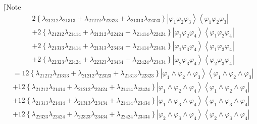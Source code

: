 \documentclass[aps,preprint]{revtex4}%
\begin{document}
$\lceil$Note
\begin{align}
&  2\left\{  \lambda_{21212}\lambda_{21313}+\lambda_{21212}\lambda
_{22323}+\lambda_{21313}\lambda_{22323}\right\}  \left\vert \varphi_{1}%
\varphi_{2}\varphi_{3}\right\rangle \left\langle \varphi_{1}\varphi_{2}%
\varphi_{3}\right\vert \nonumber\\
&  +2\left\{  \lambda_{21212}\lambda_{21414}+\lambda_{21212}\lambda
_{22424}+\lambda_{21414}\lambda_{22424}\right\}  \left\vert \varphi_{1}%
\varphi_{2}\varphi_{4}\right\rangle \left\langle \varphi_{1}\varphi_{2}%
\varphi_{4}\right\vert \nonumber\\
&  +2\left\{  \lambda_{21313}\lambda_{21414}+\lambda_{21313}\lambda
_{23434}+\lambda_{21414}\lambda_{23434}\right\}  \left\vert \varphi_{1}%
\varphi_{3}\varphi_{4}\right\rangle \left\langle \varphi_{1}\varphi_{3}%
\varphi_{4}\right\vert \nonumber\\
&  +2\left\{  \lambda_{22323}\lambda_{22424}+\lambda_{22323}\lambda
_{23434}+\lambda_{22424}\lambda_{23434}\right\}  \left\vert \varphi_{2}%
\varphi_{3}\varphi_{4}\right\rangle \left\langle \varphi_{2}\varphi_{3}%
\varphi_{4}\right\vert \nonumber
\end{align}%
\begin{align}
&  =12\left\{  \lambda_{21212}\lambda_{21313}+\lambda_{21212}\lambda
_{22323}+\lambda_{21313}\lambda_{22323}\right\}  \left\vert \varphi_{1}%
\wedge\varphi_{2}\wedge\varphi_{3}\right\rangle \left\langle \varphi_{1}%
\wedge\varphi_{2}\wedge\varphi_{3}\right\vert \nonumber\\
&  +12\left\{  \lambda_{21212}\lambda_{21414}+\lambda_{21212}\lambda
_{22424}+\lambda_{21414}\lambda_{22424}\right\}  \left\vert \varphi_{1}%
\wedge\varphi_{2}\wedge\varphi_{4}\right\rangle \left\langle \varphi_{1}%
\wedge\varphi_{2}\wedge\varphi_{4}\right\vert \nonumber\\
&  +12\left\{  \lambda_{21313}\lambda_{21414}+\lambda_{21313}\lambda
_{23434}+\lambda_{21414}\lambda_{23434}\right\}  \left\vert \varphi_{1}%
\wedge\varphi_{3}\wedge\varphi_{4}\right\rangle \left\langle \varphi_{1}%
\wedge\varphi_{3}\wedge\varphi_{4}\right\vert \nonumber\\
&  +12\left\{  \lambda_{22323}\lambda_{22424}+\lambda_{22323}\lambda
_{23434}+\lambda_{22424}\lambda_{23434}\right\}  \left\vert \varphi_{2}%
\wedge\varphi_{3}\wedge\varphi_{4}\right\rangle \left\langle \varphi_{2}%
\wedge\varphi_{3}\wedge\varphi_{4}\right\vert \nonumber
\end{align}%
\end{document}
